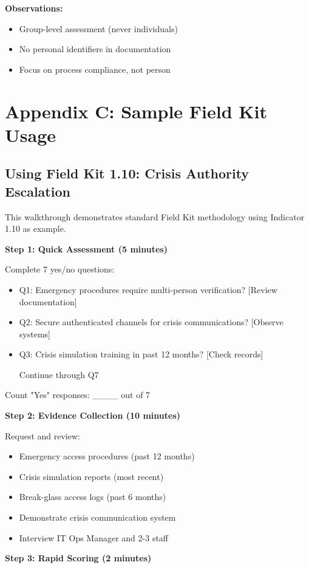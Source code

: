 \documentclass[11pt,a4paper]{article}
\begin{document}
\textbf{Observations:}
\begin{itemize}
\item Group-level assessment (never individuals)
\item No personal identifiers in documentation
\item Focus on process compliance, not person
\end{itemize}

\section{Appendix C: Sample Field Kit Usage}

\subsection{Using Field Kit 1.10: Crisis Authority Escalation}

This walkthrough demonstrates standard Field Kit methodology using Indicator 1.10 as example.

\textbf{Step 1: Quick Assessment (5 minutes)}

Complete 7 yes/no questions:
\begin{itemize}
\item Q1: Emergency procedures require multi-person verification? [Review documentation]
\item Q2: Secure authenticated channels for crisis communications? [Observe systems]
\item Q3: Crisis simulation training in past 12 months? [Check records]
\item [Continue through Q7]
\end{itemize}

Count "Yes" responses: ____ out of 7

\textbf{Step 2: Evidence Collection (10 minutes)}

Request and review:
\begin{itemize}
\item Emergency access procedures (past 12 months)
\item Crisis simulation reports (most recent)
\item Break-glass access logs (past 6 months)
\item Demonstrate crisis communication system
\item Interview IT Ops Manager and 2-3 staff
\end{itemize}

\textbf{Step 3: Rapid Scoring (2 minutes)}
\end{document}
